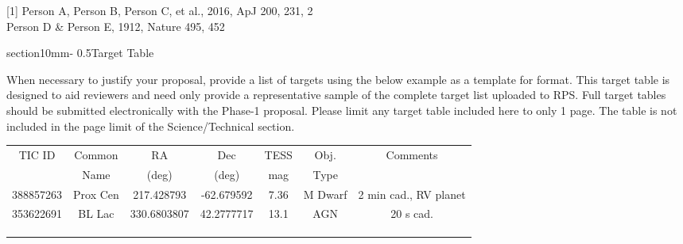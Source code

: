 \documentclass[letterpaper,12pt]{article}
\makeatletter
\renewcommand{\section}{\@startsection%
{section}{1}{0mm}{-\baselineskip}%
{0.5\baselineskip}{\normalfont\Large\bfseries}}%
\makeatother
\begin{document}
[1] Person A, Person B, Person C, et al., 2016, ApJ 200, 231, 2\\
[2] Person D \& Person E, 1912, Nature 495, 452


\section{Target Table}

When necessary to justify your proposal, provide a list of targets using the below example as a template for format. This target table is designed to aid reviewers and need only provide a representative sample of the complete target list uploaded to RPS. Full target tables should be submitted electronically with the Phase-1 proposal. Please limit any target table included here to only 1 page. The table is not included in the page limit of the Science/Technical section. 


\begin{center}
\begin{tabular}{ | c | c | c | c | c | c | c | }
\hline
TIC ID          &      Common      &     RA             &      Dec          &      TESS       &       Obj.        &      Comments \\       
                    &      Name           &     (deg)          &      (deg)        &      mag         &       Type       &                         \\     
\hline
\hline
388857263  &  Prox Cen           &  217.428793  &  -62.679592  &  7.36             &    M Dwarf    & 2 min cad., RV planet \\ \hline
353622691  &  BL Lac               &   330.6803807    &   42.2777717    &   13.1  &   AGN            &    20 s cad.                                 \\ \hline
                    &                           &                       &                      &                      &                     &                                     \\ \hline
                    &                           &                       &                      &                      &                     &                                     \\ \hline
                    &                           &                       &                      &                      &                     &                                     \\ \hline
\end{tabular}
\end{center}   

\end{document}
